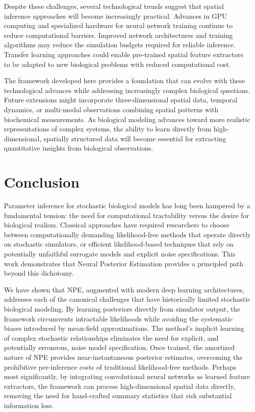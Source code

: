 \documentclass{article}
\begin{document}
Despite these challenges, several technological trends suggest that spatial inference approaches will become increasingly practical. Advances in GPU computing and specialized hardware for neural network training continue to reduce computational barriers. Improved network architectures and training algorithms may reduce the simulation budgets required for reliable inference. Transfer learning approaches could enable pre-trained spatial feature extractors to be adapted to new biological problems with reduced computational cost.

The framework developed here provides a foundation that can evolve with these technological advances while addressing increasingly complex biological questions. Future extensions might incorporate three-dimensional spatial data, temporal dynamics, or multi-modal observations combining spatial patterns with biochemical measurements. As biological modeling advances toward more realistic representations of complex systems, the ability to learn directly from high-dimensional, spatially structured data will become essential for extracting quantitative insights from biological observations.


\section{Conclusion}

Parameter inference for stochastic biological models has long been hampered by a fundamental tension: the need for computational tractability versus the desire for biological realism. Classical approaches have required researchers to choose between computationally demanding likelihood-free methods that operate directly on stochastic simulators, or efficient likelihood-based techniques that rely on potentially unfaithful surrogate models and explicit noise specifications. This work demonstrates that Neural Posterior Estimation provides a principled path beyond this dichotomy.

We have shown that NPE, augmented with modern deep learning architectures, addresses each of the canonical challenges that have historically limited stochastic biological modeling. By learning posteriors directly from simulator output, the framework circumvents intractable likelihoods while avoiding the systematic biases introduced by mean-field approximations. The method's implicit learning of complex stochastic relationships eliminates the need for explicit, and potentially erroneous, noise model specification. Once trained, the amortized nature of NPE provides near-instantaneous posterior estimates, overcoming the prohibitive per-inference costs of traditional likelihood-free methods. Perhaps most significantly, by integrating convolutional neural networks as learned feature extractors, the framework can process high-dimensional spatial data directly, removing the need for hand-crafted summary statistics that risk substantial information loss.
\end{document}
